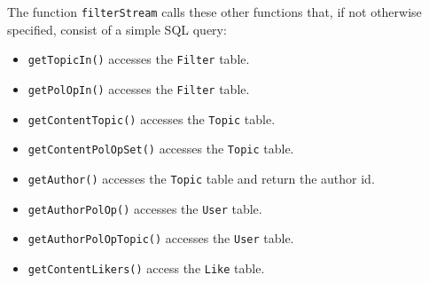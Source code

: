 \documentclass[a4paper]{article}
\begin{document}
The function \verb|filterStream| calls these other functions that, if not otherwise specified, consist of a simple SQL query:

\begin{itemize}
\item \verb|getTopicIn()| accesses the \verb|Filter| table.
\item \verb|getPolOpIn()| accesses the \verb|Filter| table.
\item \verb|getContentTopic()| accesses the \verb|Topic| table.
\item \verb|getContentPolOpSet()| accesses the \verb|Topic| table.
\item \verb|getAuthor()| accesses the \verb|Topic| table and return the author id.
\item  \verb|getAuthorPolOp()| accesses the \verb|User| table.
\item \verb|getAuthorPolOpTopic()| accesses the \verb|User| table.
\item \verb|getContentLikers()| access the \verb|Like| table.
  \end{itemize}
\end{document}
